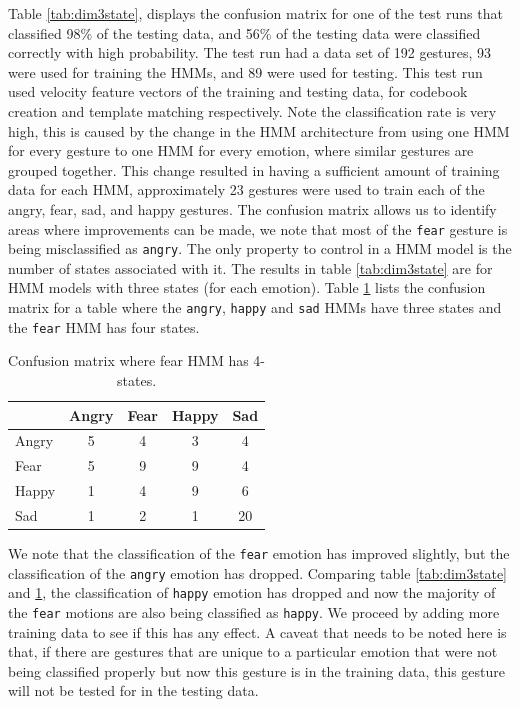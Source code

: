 \documentclass[]{report}   %
\begin{document}
Table \ref{tab:dim3state}, displays the confusion matrix for one of the test runs that classified 98\% of the testing data, and 56\% of the testing data were classified correctly with high probability. The test run had a data set of 192 gestures, 93 were used for training the HMMs, and 89 were used for testing. This test run used velocity feature vectors of the training and testing data, for codebook creation and template matching respectively. Note the classification rate is very high, this is caused by the change in the HMM architecture from using one HMM for every gesture to one HMM for every emotion, where similar gestures are grouped together. This change resulted in having a sufficient amount of training data for each HMM, approximately 23 gestures were used to train each of the angry, fear, sad, and happy gestures. The confusion matrix allows us to identify areas where improvements can be made, we note that most of the \texttt{fear} gesture is being misclassified as \texttt{angry}. The only property to control in a HMM model is the number of states associated with it. The results in table \ref{tab:dim3state} are for HMM models with three states (for each emotion). Table \ref{tab:dim4statefear} lists the confusion matrix for a table where the \texttt{angry}, \texttt{happy} and \texttt{sad} HMMs have three states and the \texttt{fear} HMM has four states.   
\begin{table}[htbp]
	\centering
		\begin{tabular}{|l|c|c|c|c|}
		\hline
             & Angry & Fear & Happy & Sad \\ \hline
        Angry & 5     & 4    & 3     & 4   \\ \hline
        Fear  & 5     & 9    & 9     & 4   \\ \hline
        Happy & 1     & 4    & 9    & 6  \\ \hline
        Sad   & 1     & 2    & 1     & 20  \\
		\hline
		\end{tabular}
	\caption{Confusion matrix where fear HMM has 4-states.}
	\label{tab:dim4statefear}
\end{table}
We note that the classification of the \texttt{fear} emotion has improved slightly, but the classification of the \texttt{angry} emotion has dropped. Comparing table \ref{tab:dim3state} and \ref{tab:dim4statefear}, the classification of \texttt{happy} emotion has dropped and now the majority of the \texttt{fear} motions are also being classified as \texttt{happy}. We proceed by adding more training data to see if this has any effect. A caveat that needs to be noted here is that, if there are gestures that are unique to a particular emotion that were not being classified properly but now this gesture is in the training data, this gesture will not be tested for in the testing data. 
\end{document}

